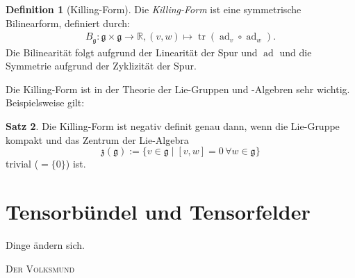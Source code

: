 \documentclass[a4paper]{scrbook}
\numberwithin{equation}{chapter}
\DeclareMathOperator{\ad}{ad}
\DeclareMathOperator{\tr}{tr}
\newcommand{\R}{\mathbb{R}}
\theoremstyle{definition}
\newtheorem{defn}{Definition}[section]
\newtheorem{satz}[defn]{Satz}
\begin{document}
		\begin{defn}[Killing-Form]
			Die \emph{Killing-Form} ist eine symmetrische Bilinearform, definiert durch:
			\begin{align*}
				B_{\mathfrak{g}}\colon\mathfrak{g}\times\mathfrak{g}\rightarrow\R, (v,w)\mapsto \tr(\ad_v\circ\ad_w).
			\end{align*}
			Die Bilinearität folgt aufgrund der Linearität der Spur und $\ad$ und die Symmetrie aufgrund der Zyklizität der Spur.
		\end{defn}
		Die Killing-Form ist in der Theorie der Lie-Gruppen und -Algebren sehr wichtig. Beispielsweise gilt:
		\begin{satz}
			Die Killing-Form ist negativ definit genau dann, wenn die Lie-Gruppe kompakt und das Zentrum der Lie-Algebra
			\begin{equation*}
				\mathfrak{z}(\mathfrak{g}):=\lbrace v\in\mathfrak{g}\mid \left[v,w\right]=0\,\forall w\in\mathfrak{g}\rbrace
			\end{equation*}
			trivial ($=\lbrace 0\rbrace$) ist.
		\end{satz}
		
\chapter{Tensorbündel und Tensorfelder}
\epigraph{Dinge ändern sich.}{\textsc{Der Volksmund}}
\end{document}
